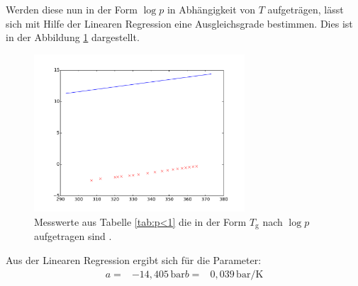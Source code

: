 Werden diese nun in der Form $\log p$ in Abhängigkeit von $T$ aufgeträgen,
lässt sich mit Hilfe der Linearen Regression eine Ausgleichsgrade bestimmen.
Dies ist in der Abbildung \ref{abb:plot1} dargestellt.
\begin{figure}
  \centering
  \includegraphics[width=0.7\textwidth]{plot1.pdf}
  \caption{Messwerte aus Tabelle \ref{tab:p<1} die in der Form $T_\mathrm{g}$ nach $\log p$ aufgetragen sind . }
  \label{abb:plot1}
\end{figure}
Aus der Linearen Regression ergibt sich für die Parameter:
\begin{align*}
  a=& -14,405\,\si{\bar}
  b=&   0,039\,\si{\bar\per\kelvin}
\end{align*}



